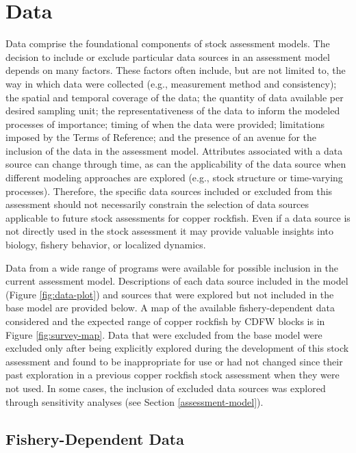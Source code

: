 \documentclass[11pt,
  letterpaper,
]{article}
\begin{document}
\section{Data}\label{data}

Data comprise the foundational components of stock assessment models. The decision to include or exclude particular data sources in an assessment model depends on many factors. These factors often include, but are not limited to, the way in which data were collected (e.g., measurement method and consistency); the spatial and temporal coverage of the data; the quantity of data available per desired sampling unit; the representativeness of the data to inform the modeled processes of importance; timing of when the data were provided; limitations imposed by the Terms of Reference; and the presence of an avenue for the inclusion of the data in the assessment model. Attributes associated with a data source can change through time, as can the applicability of the data source when different modeling approaches are explored (e.g., stock structure or time-varying processes). Therefore, the specific data sources included or excluded from this assessment should not necessarily constrain the selection of data sources applicable to future stock assessments for copper rockfish. Even if a data source is not directly used in the stock assessment it may provide valuable insights into biology, fishery behavior, or localized dynamics.

Data from a wide range of programs were available for possible inclusion in the current assessment model. Descriptions of each data source included in the model (Figure \ref{fig:data-plot}) and sources that were explored but not included in the base model are provided below. A map of the available fishery-dependent data considered and the expected range of copper rockfish by CDFW blocks is in Figure \ref{fig:survey-map}. Data that were excluded from the base model were excluded only after being explicitly explored during the development of this stock assessment and found to be inappropriate for use or had not changed since their past exploration in a previous copper rockfish stock assessment when they were not used. In some cases, the inclusion of excluded data sources was explored through sensitivity analyses (see Section \ref{assessment-model}).

\subsection{Fishery-Dependent Data}\label{fishery-dependent-data}
\end{document}
